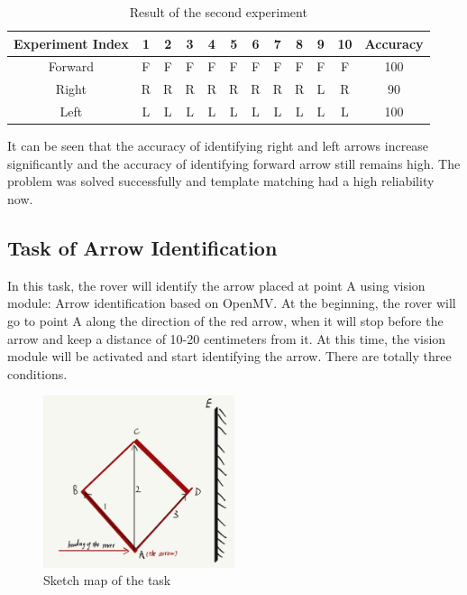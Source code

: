 \documentclass[12pt, a4paper, oneside]{report}
\begin{document}
\begin{table}[H]
    \centering
\begin{tabular}{|*{12}{c|}}

    \hline
  Experiment Index & 1 & 2 & 3 & 4 & 5 & 6 & 7 & 8 & 9 & 10 & Accuracy\\
    \hline
  Forward & F & F & F & F & F & F & F & F & F & F & 100\text{\%}\\
    \hline
  Right & R & R & R & R & R & R & R & R & L & R & 90\text{\%}\\
    \hline
  Left & L & L & L & L & L & L & L & L & L & L & 100\text{\%}\\
    \hline
  
\end{tabular}
    \caption{Result of the second experiment}
    \label{tab:Result of the second experiment}
\end{table}

It can be seen that the accuracy of identifying right and left arrows increase significantly and the accuracy of identifying forward arrow still remains high. The problem was solved successfully and template matching had a high reliability now.

\subsection{Task of Arrow Identification}
In this task, the rover will identify the arrow placed at point A using vision module: Arrow identification based on OpenMV. At the beginning, the rover will go to point A along the direction of the red arrow, when it will stop before the arrow and keep a distance of 10-20 centimeters from it. At this time, the vision module will be activated and start identifying the arrow. There are totally three conditions. 

\begin{figure}[H]
  \centering
  \includegraphics[width=0.5\textwidth]{pic/Arrow Rec/7.jpg}
  \caption{Sketch map of the task}
  \label{fig:Sketch map of the task}
\end{figure}
\end{document}
